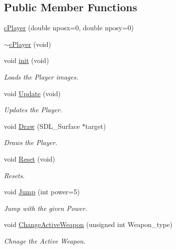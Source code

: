 \subsection*{Public Member Functions}
\begin{DoxyCompactItemize}
\item 
\hyperlink{classc_player_a2f5ad612d7d76643fdb1fbb858b75f83}{c\-Player} (double nposx=0, double nposy=0)
\item 
\hyperlink{classc_player_abb95c5d2e16e305c1a08bdb3cea2010e}{$\sim$c\-Player} (void)
\item 
void \hyperlink{classc_player_ac2d3fad59338a19b9c46af34f99d62ed}{init} (void)
\begin{DoxyCompactList}\small\item\em Loads the Player images. \end{DoxyCompactList}\item 
void \hyperlink{classc_player_a28a14211f3f36ed0ef550fc973ab1858}{Update} (void)
\begin{DoxyCompactList}\small\item\em Updates the Player. \end{DoxyCompactList}\item 
void \hyperlink{classc_player_ae0249c95a88a50dcd2605df2940ed707}{Draw} (S\-D\-L\-\_\-\-Surface $\ast$target)
\begin{DoxyCompactList}\small\item\em Draws the Player. \end{DoxyCompactList}\item 
void \hyperlink{classc_player_a614d07b3557166554b6b800f480ff030}{Reset} (void)
\begin{DoxyCompactList}\small\item\em Resets. \end{DoxyCompactList}\item 
void \hyperlink{classc_player_a739e0557508704c44f6c6f6a69ef914b}{Jump} (int power=5)
\begin{DoxyCompactList}\small\item\em Jump with the given Power. \end{DoxyCompactList}\item 
void \hyperlink{classc_player_a7eb61f626845f9e24b5791de6f8359d0}{Change\-Active\-Weapon} (unsigned int Weapon\-\_\-type)
\begin{DoxyCompactList}\small\item\em Chnage the Active Weapon. \end{DoxyCompactList}\item 

\end{DoxyCompactItemize}
